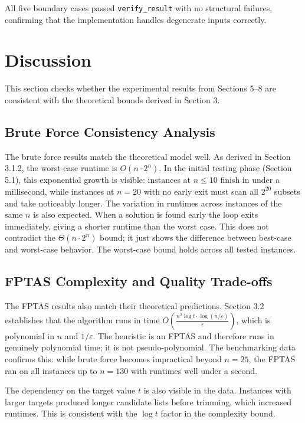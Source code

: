 \documentclass[12pt,a4paper]{article}
\theoremstyle{definition}
\begin{document}
All five boundary cases passed \texttt{verify\_result} with no structural failures, confirming that the implementation handles degenerate inputs correctly.

\section{Discussion}

This section checks whether the experimental results from Sections 5--8 are consistent with the theoretical bounds derived in Section 3.

\subsection{Brute Force Consistency Analysis}

The brute force results match the theoretical model well. As derived in Section 3.1.2, the worst-case runtime is $O(n \cdot 2^n)$. In the initial testing phase (Section 5.1), this exponential growth is visible: instances at $n \le 10$ finish in under a millisecond, while instances at $n = 20$ with no early exit must scan all $2^{20}$ subsets and take noticeably longer. The variation in runtimes across instances of the same $n$ is also expected. When a solution is found early the loop exits immediately, giving a shorter runtime than the worst case. This does not contradict the $\Theta(n \cdot 2^n)$ bound; it just shows the difference between best-case and worst-case behavior. The worst-case bound holds across all tested instances.

\subsection{FPTAS Complexity and Quality Trade-offs}

The FPTAS results also match their theoretical predictions. Section 3.2 establishes that the algorithm runs in time $O\left(\frac{n^2 \log t \cdot \log(n/\varepsilon)}{\varepsilon}\right)$, which is polynomial in $n$ and $1/\varepsilon$. The heuristic is an FPTAS and therefore runs in genuinely polynomial time; it is not pseudo-polynomial. The benchmarking data confirms this: while brute force becomes impractical beyond $n = 25$, the FPTAS ran on all instances up to $n = 130$ with runtimes well under a second.

The dependency on the target value $t$ is also visible in the data. Instances with larger targets produced longer candidate lists before trimming, which increased runtimes. This is consistent with the $\log t$ factor in the complexity bound.
\end{document}

